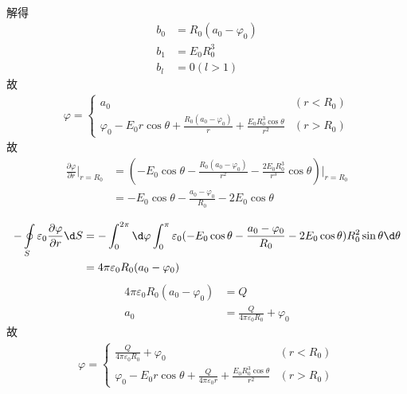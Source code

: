 \documentclass{phyasgn}
\begin{document}
\begin{sol}[1]
\begin{align*}
  \end{align*}
  解得
  \begin{align*}
    b_0&=R_0(a_0-\varphi_0)\\
    b_1&=E_0R_0^3\\
    b_l&=0(l>1)
  \end{align*}
  故
  \begin{align*}
    \varphi=\left\{\begin{matrix}
      a_0&(r<R_0)\\
      \varphi_0-E_0r\cos\theta+\frac{R_0(a_0-\varphi_0)}{r}+\frac{E_0R_0^3\cos\theta}{r^2}&(r>R_0)
    \end{matrix}\right.
  \end{align*}
  故
  \begin{align*}
    \frac{\partial \varphi}{\partial r}|_{r=R_0}&=(-E_0\cos\theta-\frac{R_0(a_0-\varphi_0)}{r^2}-\frac{2E_0R_0^3}{r^3}\cos\theta)|_{r=R_0}\\
    &=-E_0\cos\theta-\frac{a_0-\varphi_0}{R_0}-2E_0\cos\theta\\
  \end{align*}
  \begin{align*}
    -\oint\limits_{S}\varepsilon_0\frac{\partial \varphi}{\partial r}\d S&=-\int_{0}^{2\pi}\d \varphi\int_{0}^{\pi}\varepsilon_0(-E_0\cos\theta-\frac{a_0-\varphi_0}{R_0}-2E_0\cos\theta)R_0^2\sin\theta\d\theta\\
    &=4\pi\varepsilon_0R_0(a_0-\varphi_0)
  \end{align*}
  \begin{align*}
    4\pi\varepsilon_0R_0(a_0-\varphi_0)&=Q\\
    a_0&=\frac{Q}{4\pi\varepsilon_0R_0}+\varphi_0
  \end{align*}
  故
  \begin{align*}
    \varphi=\left\{\begin{matrix}
    \frac{Q}{4\pi\varepsilon_0R_0}+\varphi_0&(r<R_0)\\
      \varphi_0-E_0r\cos\theta+\frac{Q}{4\pi \varepsilon_0 r}+\frac{E_0R_0^3\cos\theta}{r^2}&(r>R_0)
    \end{matrix}\right.
  \end{align*}
\end{sol}\par
\end{document}
